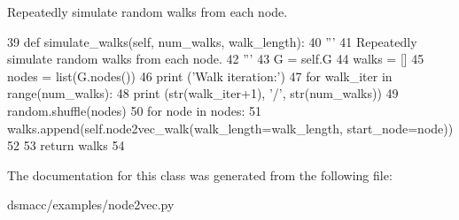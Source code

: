 \begin{DoxyVerb}Repeatedly simulate random walks from each node.
\end{DoxyVerb}
 
\begin{DoxyCode}
39     \textcolor{keyword}{def }simulate\_walks(self, num\_walks, walk\_length):
40         \textcolor{stringliteral}{'''}
41 \textcolor{stringliteral}{        Repeatedly simulate random walks from each node.}
42 \textcolor{stringliteral}{        '''}
43         G = self.G
44         walks = []
45         nodes = list(G.nodes())
46         \textcolor{keywordflow}{print} (\textcolor{stringliteral}{'Walk iteration:'})
47         \textcolor{keywordflow}{for} walk\_iter \textcolor{keywordflow}{in} range(num\_walks):
48             \textcolor{keywordflow}{print} (str(walk\_iter+1), \textcolor{stringliteral}{'/'}, str(num\_walks))
49             random.shuffle(nodes)
50             \textcolor{keywordflow}{for} node \textcolor{keywordflow}{in} nodes:
51                 walks.append(self.node2vec\_walk(walk\_length=walk\_length, start\_node=node))
52 
53         \textcolor{keywordflow}{return} walks
54 
\end{DoxyCode}


The documentation for this class was generated from the following file\+:\begin{DoxyCompactItemize}
\item 
dsmacc/examples/node2vec.\+py\end{DoxyCompactItemize}
